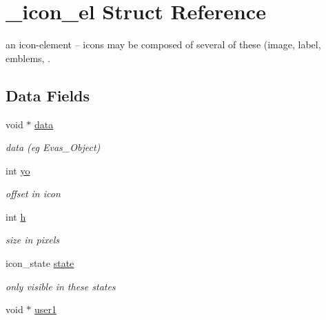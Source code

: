 \hypertarget{struct__icon__el}{
\section{\_\-icon\_\-el Struct Reference}
\label{struct__icon__el}
}
an icon-element -- icons may be composed of several of these (image, label, emblems, .  


\subsection*{Data Fields}
\begin{CompactItemize}
\item 
\hypertarget{struct__icon__el_o0}{
void $\ast$ \hyperlink{struct__icon__el_o0}{data}}
\label{struct__icon__el_o0}

\begin{CompactList}\small\item\em data (eg Evas\_\-Object) \item\end{CompactList}\item 
\hypertarget{struct__icon__el_o2}{
int \hyperlink{struct__icon__el_o2}{yo}}
\label{struct__icon__el_o2}

\begin{CompactList}\small\item\em offset in icon \item\end{CompactList}\item 
\hypertarget{struct__icon__el_o4}{
int \hyperlink{struct__icon__el_o4}{h}}
\label{struct__icon__el_o4}

\begin{CompactList}\small\item\em size in pixels \item\end{CompactList}\item 
\hypertarget{struct__icon__el_o5}{
icon\_\-state \hyperlink{struct__icon__el_o5}{state}}
\label{struct__icon__el_o5}

\begin{CompactList}\small\item\em only visible in these states \item\end{CompactList}\item 
\hypertarget{struct__icon__el_o6}{
void $\ast$ \hyperlink{struct__icon__el_o6}{user1}}
\label{struct__icon__el_o6}


\end{CompactItemize}

